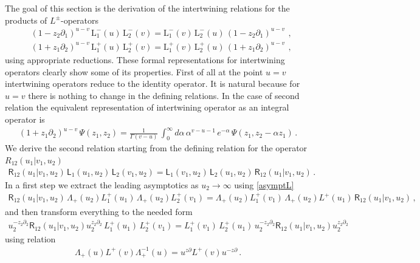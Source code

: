 \documentclass[11pt]{article}
\numberwithin{equation}{section}
\theoremstyle{plain}
\theoremstyle{definition}
\def\dd{\partial}
\newcommand{\R}{\mathsf{R}}
\begin{document}
The goal of this section is the derivation of the 
intertwining relations for the products of $L^{\pm}$-operators 
\begin{align}\label{--}
	&(1-z_2 \dd_{1})^{u-v} \,
	\mathrm{L}^{-}_{1}(u) \, \mathrm{L}^{-}_{2}(v) =
	\mathrm{L}^{-}_{1}(v)\, \mathrm{L}^{-}_{2}(u)\,
	(1-z_2 \dd_{1})^{u-v}\ \,, \\ \label{++}
	&(1+z_{1} \dd_{2})^{u-v} \,
	\mathrm{L}^{+}_{1}(u) \, \mathrm{L}^{+}_{2}(v) =
	\mathrm{L}^{+}_{1}(v)\, \mathrm{L}^{+}_{2}(u) \,
	(1+z_{1} \dd_{2})^{u-v}\ \,,
\end{align}
using appropriate reductions. 
These formal representations for intertwining operators 
clearly show some of its properties. 
First of all at the point $u=v$ intertwining 
operators reduce to the identity operator. 
It is natural because for $u=v$ there is 
nothing to change in the defining relations. 
In the case of second relation the equivalent representation 
of intertwining operator as an integral operator is  
\begin{align} 
	(1+z_{1} \dd_{2})^{u-v}
	\,\Psi(z_1,z_2) = 
	\frac{1}{\Gamma(v-u)}\,
	\int_{0}^{\infty} d\alpha\,\alpha^{v-u-1} 
	\,e^{-\alpha}\,\Psi(z_1,z_2-\alpha z_1)\,.
\end{align}
We derive the second relation starting from the 
defining relation for the operator $R_{12}(u_1|v_1,u_2)$
\begin{align*}
	\R_{12}(u_1|v_1,u_2)\,
	\mathsf{L}_{1}(u_1,u_2)\,\mathsf{L}_{2}(v_1,u_2)=
	\mathsf{L}_{1}(v_1,u_2)\,\mathsf{L}_{2}(u_1,u_2)\,
	\R_{12}(u_1|v_1,u_2)\,.
\end{align*}
In a first step we extract the leading asymptotics as $u_2 \to \infty$ using \eqref{asymptL}
\begin{align*}
	\R_{12}(u_1|v_1,u_2)\,\Lambda_{+}(u_2)
	L_1^{+}(u_1)\,\Lambda_{+}(u_2)L_2^{+}(v_1) = 
	\Lambda_{+}(u_2)L_1^{+}(v_1)\,\Lambda_{+}(u_2)L^{+}(u_1)\,
	\R_{12}(u_1|v_1,u_2)\,, 
\end{align*}
and then transform everything to the needed form 
\begin{align}\label{needed}
	u_2^{-z_2\partial_2}\R_{12}(u_1|v_1,u_2)u_2^{z_2\partial_2}\,
	L_1^{+}(u_1)\,L_2^{+}(v_1)  =
	L_1^{+}(v_1)\,L_2^{+}(u_1)\, 
	u_2^{-z_2\partial_2} 
	\R_{12}(u_1|v_1,u_2)u_2^{z_2\partial_2}\,
\end{align}
using relation 
\begin{align}\label{similar}
	\Lambda_+(u) L^{+}(v) \Lambda^{-1}_+(u) = 
	u^{z\partial} L^{+}(v) u^{-z\partial}\,.
\end{align}
\end{document}
